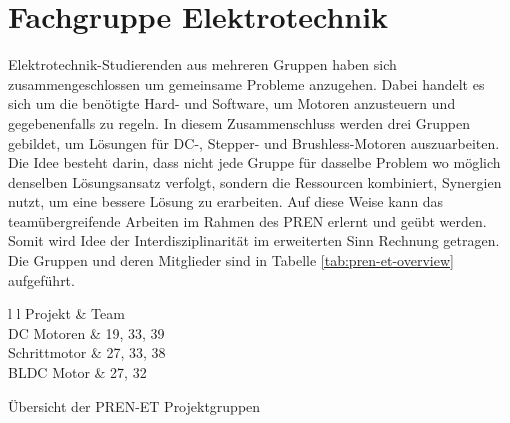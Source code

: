 \section{Fachgruppe Elektrotechnik}
\label{sec:pren-et}
Elektrotechnik-Studierenden aus mehreren Gruppen haben sich
zusammengeschlossen um gemeinsame Probleme anzugehen. Dabei handelt es sich
um die benötigte Hard- und Software, um Motoren anzusteuern
und gegebenenfalls zu regeln. In diesem Zusammenschluss werden drei Gruppen
gebildet, um Lösungen für DC-, Stepper- und Brushless-Motoren auszuarbeiten.
Die Idee besteht darin, dass nicht jede Gruppe für dasselbe Problem wo
möglich denselben Lösungsansatz verfolgt, sondern die Ressourcen kombiniert,
Synergien nutzt, um eine bessere Lösung zu erarbeiten. Auf diese Weise kann
das teamübergreifende Arbeiten im Rahmen des PREN erlernt und
geübt werden. Somit wird Idee der Interdisziplinarität im erweiterten Sinn
Rechnung getragen. Die Gruppen und deren Mitglieder sind in Tabelle 
\ref{tab:pren-et-overview} aufgeführt.
\begin{table}[h!]
	\centering
	\begin{zebratabular}{l l}
		 Projekt		& Team \\
		DC Motoren   & 19, 33, 39 \\
		Schrittmotor & 27, 33, 38 \\
		BLDC Motor   & 27, 32 \\
	\end{zebratabular}
	\caption{Übersicht der PREN-ET Projektgruppen}
	\label{tab:pren-et-overview}
\end{table}
